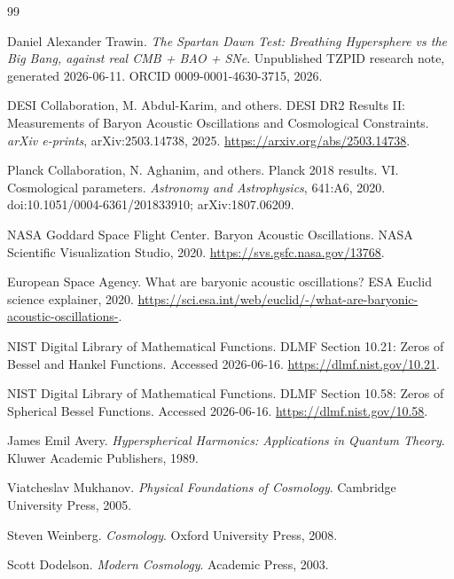 \documentclass[11pt]{article}
\begin{document}
\begin{thebibliography}{99}

Daniel Alexander Trawin.
\newblock \emph{The Spartan Dawn Test: Breathing Hypersphere vs the Big Bang, against real CMB + BAO + SNe}.
\newblock Unpublished TZPID research note, generated 2026-06-11. ORCID 0009-0001-4630-3715, 2026.

DESI Collaboration, M. Abdul-Karim, and others.
\newblock DESI DR2 Results II: Measurements of Baryon Acoustic Oscillations and Cosmological Constraints.
\newblock \emph{arXiv e-prints}, arXiv:2503.14738, 2025.
\newblock \url{https://arxiv.org/abs/2503.14738}.

Planck Collaboration, N. Aghanim, and others.
\newblock Planck 2018 results. VI. Cosmological parameters.
\newblock \emph{Astronomy and Astrophysics}, 641:A6, 2020.
\newblock doi:10.1051/0004-6361/201833910; arXiv:1807.06209.

NASA Goddard Space Flight Center.
\newblock Baryon Acoustic Oscillations.
\newblock NASA Scientific Visualization Studio, 2020.
\newblock \url{https://svs.gsfc.nasa.gov/13768}.

European Space Agency.
\newblock What are baryonic acoustic oscillations?
\newblock ESA Euclid science explainer, 2020.
\newblock \url{https://sci.esa.int/web/euclid/-/what-are-baryonic-acoustic-oscillations-}.

NIST Digital Library of Mathematical Functions.
\newblock DLMF Section 10.21: Zeros of Bessel and Hankel Functions.
\newblock Accessed 2026-06-16.
\newblock \url{https://dlmf.nist.gov/10.21}.

NIST Digital Library of Mathematical Functions.
\newblock DLMF Section 10.58: Zeros of Spherical Bessel Functions.
\newblock Accessed 2026-06-16.
\newblock \url{https://dlmf.nist.gov/10.58}.

James Emil Avery.
\newblock \emph{Hyperspherical Harmonics: Applications in Quantum Theory}.
\newblock Kluwer Academic Publishers, 1989.

Viatcheslav Mukhanov.
\newblock \emph{Physical Foundations of Cosmology}.
\newblock Cambridge University Press, 2005.

Steven Weinberg.
\newblock \emph{Cosmology}.
\newblock Oxford University Press, 2008.

Scott Dodelson.
\newblock \emph{Modern Cosmology}.
\newblock Academic Press, 2003.

\end{thebibliography}
\end{document}
